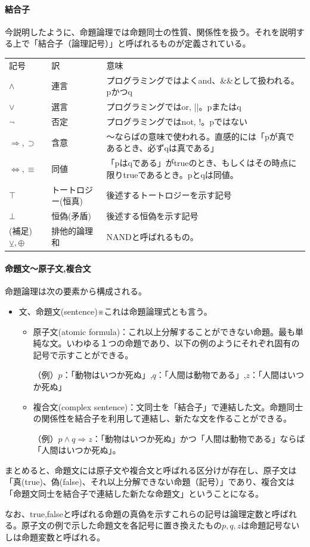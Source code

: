 \documentclass[dvipdfmx]{jsarticle}
\begin{document}
  \paragraph{結合子}
  今説明したように、命題論理では命題同士の性質、関係性を扱う。それを説明する上で「結合子（論理記号）」と呼ばれるものが定義されている。
    \begin{table}[H]
      \centering
      \begin{tabular}{lll}
      記号                & 訳 & 意味\\
      $\wedge$          & 連言 & プログラミングではよくand、\&\&として扱われる。pかつq\\
      $\vee$            & 選言 & プログラミングではor, ||。pまたはq\\
      $\neg$            & 否定 & プログラミングではnot, !。pではない\\
      $\Rightarrow, \supset$     & 含意 &〜ならばの意味で使われる。直感的には「pが真であるとき、必ずqは真である」\\
      $\Leftrightarrow, \equiv$ & 同値 &「pはqである」がtrueのとき、もしくはその時点に限りtrueであるとき。pとqは同値。\\
      $\top$ &トートロジー(恒真)&後述するトートロジーを示す記号 \\
      $\bot$ &恒偽(矛盾)&後述する恒偽を示す記号\\
      (補足)$\veebar, \oplus$ & 排他的論理和& NANDと呼ばれるもの。\\
      \end{tabular}
  \end{table}
  \paragraph{命題文〜原子文,複合文}
  命題論理は次の要素から構成される。
  \begin{itemize}
    \item 文、命題文(sentence)※これは命題論理式とも言う。
    \begin{itemize}
      \item 原子文(atomic formula)：これ以上分解することができない命題。最も単純な文。いわゆる１つの命題であり、以下の例のようにそれぞれ固有の記号で示すことができる。\par
      （例）$p$：「動物はいつか死ぬ」,$q$：「人間は動物である」,$z$：「人間はいつか死ぬ」
      \item 複合文(complex sentence)：文同士を「結合子」で連結した文。命題同士の関係性を結合子を利用して連結し、新たな文を作ることができる。\par
      （例）$p \wedge q \Rightarrow z$：「動物はいつか死ぬ」かつ「人間は動物である」ならば「人間はいつか死ぬ」。
    \end{itemize}
  \end{itemize}
  まとめると、命題文には原子文や複合文と呼ばれる区分けが存在し、原子文は「真(true)、偽(false)、それ以上分解できない命題（記号）」であり、複合文は「命題文同士を結合子で連結した新たな命題文」ということになる。\par
  なお、true,falseと呼ばれる命題の真偽を示すこれらの記号は論理定数と呼ばれる。原子文の例で示した命題文を各記号に置き換えたもの$p,q,z$は命題記号ないしは命題変数と呼ばれる。\par
\end{document}
